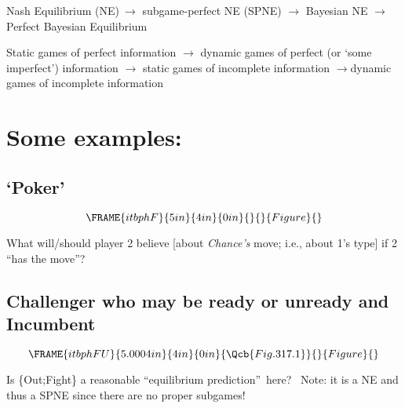 \documentclass{article}
\begin{document}
Nash Equilibrium (NE)$\ \mathbf{\rightarrow }$ subgame-perfect NE (SPNE) $%
\mathbf{\rightarrow }$ Bayesian NE $\mathbf{\rightarrow }$ Perfect Bayesian
Equilibrium

Static games of perfect information $\mathbf{\rightarrow }$ dynamic games of
perfect (or `some imperfect') information $\mathbf{\rightarrow }$ static
games of incomplete information $\mathbf{\rightarrow }$dynamic games of
incomplete information

\bigskip

\section{Some examples:}

\subsection{\textbf{`Poker'}}

\[
\FRAME{itbphF}{5in}{4in}{0in}{}{}{Figure}{\special{language "Scientific
Word";type "GRAPHIC";maintain-aspect-ratio TRUE;display "USEDEF";valid_file
"T";width 5in;height 4in;depth 0in;original-width 4.6799in;original-height
3.584in;cropleft "0";croptop "1";cropright "1";cropbottom "0";tempfilename
'JSHANV2Y.wmf';tempfile-properties "XPR";}}
\]

What will/should player 2 believe [about \textit{Chance's }move; i.e., about
1's type] if 2 \textquotedblleft has the move\textquotedblright ?

\bigskip

\subsection{Challenger who may be ready or unready and Incumbent}

\begin{equation}
\FRAME{itbphFU}{5.0004in}{4in}{0in}{\Qcb{Fig. 317.1}}{}{Figure}{\special%
{language "Scientific Word";type "GRAPHIC";maintain-aspect-ratio
TRUE;display "USEDEF";valid_file "T";width 5.0004in;height 4in;depth
0in;original-width 5.6886in;original-height 3.5201in;cropleft "0";croptop
"1";cropright "1";cropbottom "0";tempfilename
'JSHANV2Z.wmf';tempfile-properties "XPR";}}
\end{equation}

Is \{Out;Fight\} a reasonable \textquotedblleft equilibrium
prediction\textquotedblright\ here? \ Note: it is a NE and thus a SPNE since
there are no proper subgames!
\end{document}
